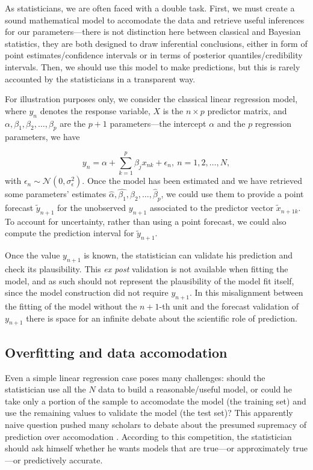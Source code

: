 \documentclass{statsoc}
\begin{document}
As statisticians, we are often faced with a double task. First, we must create a sound mathematical model to accomodate the data and retrieve useful inferences for our 
parameters---there is not distinction here between classical and Bayesian statistics, they are both designed to draw inferential conclusions, either in form of point estimates/confidence intervals or in terms of posterior quantiles/credibility intervals. Then, we should use this model to make predictions, but this is rarely accounted by the statisticians in a transparent way.

For illustration purposes only, we consider the classical linear regression model, where $y_n$ denotes the response variable, $X$ is the $n \times p$ predictor matrix, and $\alpha,\beta_1,\beta_2,\ldots,\beta_p$ are the $p+1$ parameters---the intercept $\alpha$ and the $p$ regression parameters, we have

\begin{equation}
y_n = \alpha + \sum_{k=1}^p \beta_j x_{nk} + \epsilon_n, \ n=1,2,\ldots,N,
\label{eq:linear}
\end{equation}
%
with $\epsilon_n \sim \mathcal{N}(0, \sigma^2_{\epsilon})$. Once the model has been estimated and we have retrieved some parameters' estimates $\hat{\alpha}, \hat{\beta_1}, \beta_{2},\ldots,\hat{\beta}_p$, we could use them to provide a point forecast $\tilde{y}_{n+1}$ for the unobserved ${y}_{n+1}$ associated to the predictor vector $\tilde{x}_{n+1k}$. To account for uncertainty, rather than using a point forecast, we could also compute the prediction interval for $\tilde{y}_{n+1}$.

Once the value $y_{n+1}$ is known, the statistician can validate his prediction and check its plausibility. This \emph{ex post} validation is not available when fitting the model, and as such should not represent the plausibility of the model fit itself, since the model construction did not require $y_{n+1}$. In this misalignment between the fitting of the model without the $n+1$-th unit and the forecast validation of $y_{n+1}$ there is space for an infinite debate about the scientific role of prediction.




\subsection{Overfitting and data accomodation}

Even a simple linear regression case poses many challenges: should the statistician use all the $N$ data to build a reasonable/useful model, or could he take only a portion of the sample to accomodate the model (the training set) and use the remaining values to validate the model (the test set)? This apparently naive question pushed many scholars to debate about the presumed supremacy of prediction over accomodation \citep{maher1988prediction, hitchcock2004prediction, worrall2014prediction}. According to this competition, the statistician should ask himself whether he wants models that are true---or  approximately true---or predictively accurate. 
\end{document}
